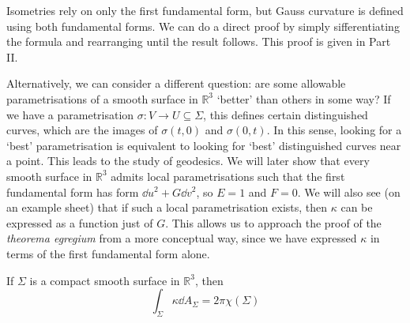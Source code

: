 \begin{remark}
	Isometries rely on only the first fundamental form, but Gauss curvature is defined using both fundamental forms.
	We can do a direct proof by simply sifferentiating the formula and rearranging until the result follows.
	This proof is given in Part II.

	Alternatively, we can consider a different question: are some allowable parametrisations of a smooth surface in \( \mathbb R^3 \) `better' than others in some way?
	If we have a parametrisation \( \sigma \colon V \to U \subseteq \Sigma \), this defines certain distinguished curves, which are the images of \( \sigma(t,0) \) and \( \sigma(0,t) \).
	In this sense, looking for a `best' parametrisation is equivalent to looking for `best' distinguished curves near a point.
	This leads to the study of geodesics.
	We will later show that every smooth surface in \( \mathbb R^3 \) admits local parametrisations such that the first fundamental form has form \( \dd{u}^2 + G \dd{v}^2 \), so \( E = 1 \) and \( F = 0 \).
	We will also see (on an example sheet) that if such a local parametrisation exists, then \( \kappa \) can be expressed as a function just of \( G \).
	This allows us to approach the proof of the \textit{theorema egregium} from a more conceptual way, since we have expressed \( \kappa \) in terms of the first fundamental form alone.
\end{remark}
\begin{theorem}
	If \( \Sigma \) is a compact smooth surface in \( \mathbb R^3 \), then
	\[ \int_\Sigma \kappa \dd{A_\Sigma} = 2 \pi \chi(\Sigma) \]
\end{theorem}
